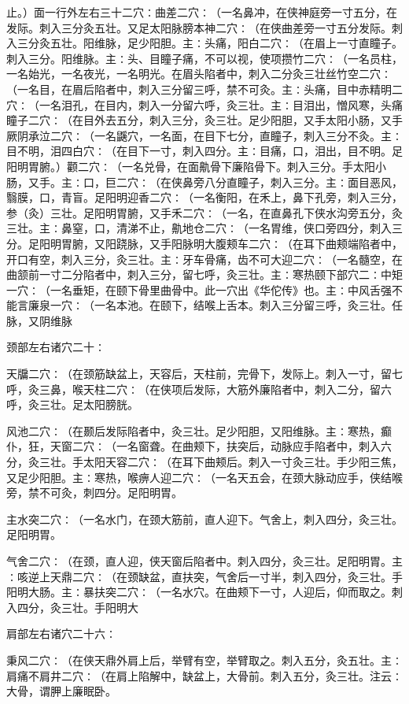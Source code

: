 \documentclass[a4paper,12pt,UTF8,twoside]{ctexbook}
\begin{document}
止。）面一行外左右三十二穴∶曲差二穴∶（一名鼻冲，在侠神庭旁一寸五分，在发际。刺入三分灸五壮。又足太阳脉膀本神二穴∶（在侠曲差旁一寸五分发际。刺入三分灸五壮。阳维脉，足少阳胆。主∶头痛，阳白二穴∶（在眉上一寸直瞳子。刺入三分。阳维脉。主∶头、目瞳子痛，不可以视，使项攒竹二穴∶（一名员柱，一名始光，一名夜光，一名明光。在眉头陷者中，刺入二分灸三壮丝竹空二穴∶（一名目，在眉后陷者中，刺入三分留三呼，禁不可灸。主∶头痛，目中赤精明二穴∶（一名泪孔，在目内，刺入一分留六呼，灸三壮。主∶目泪出，憎风寒，头痛瞳子二穴∶（在目外去五分，刺入三分，灸三壮。足少阳胆，又手太阳小肠，又手厥阴承泣二穴∶（一名鼷穴，一名面，在目下七分，直瞳子，刺入三分不灸。主∶目不明，泪四白穴∶（在目下一寸，刺入四分。主∶目痛，口，泪出，目不明。足阳明胃腑。）颧二穴∶（一名兑骨，在面鼽骨下廉陷骨下。刺入三分。手太阳小肠，又手。主∶口，巨二穴∶（在侠鼻旁八分直瞳子，刺入三分。主∶面目恶风，翳膜，口，青盲。足阳明迎香二穴∶（一名衡阳，在禾上，鼻下孔旁，刺入三分，参（灸）三壮。足阳明胃腑，又手禾二穴∶（一名，在直鼻孔下侠水沟旁五分，灸三壮。主∶鼻窒，口，清涕不止，鼽地仓二穴∶（一名胃维，侠口旁四分，刺入三分。足阳明胃腑，又阳跷脉，又手阳脉明大腹颊车二穴∶（在耳下曲颊端陷者中，开口有空，刺入三分，灸三壮。主∶牙车骨痛，齿不可大迎二穴∶（一名髓空，在曲颔前一寸二分陷者中，刺入三分，留七呼，灸三壮。主∶寒热颐下部穴二∶中矩一穴∶（一名垂矩，在颐下骨里曲骨中。此一穴出《华佗传》也。主∶中风舌强不能言廉泉一穴∶（一名本池。在颐下，结喉上舌本。刺入三分留三呼，灸三壮。任脉，又阴维脉

颈部左右诸穴二十∶

天牖二穴∶（在颈筋缺盆上，天容后，天柱前，完骨下，发际上。刺入一寸，留七呼，灸三鼻，喉天柱二穴∶（在侠项后发际，大筋外廉陷者中，刺入二分，留六呼，灸三壮。足太阳膀胱。

风池二穴∶（在颞后发际陷者中，灸三壮。足少阳胆，又阳维脉。主∶寒热，癫仆，狂，天窗二穴∶（一名窗聋。在曲颊下，扶突后，动脉应手陷者中，刺入六分，灸三壮。手太阳天容二穴∶（在耳下曲颊后。刺入一寸灸三壮。手少阳三焦，又足少阳胆。主∶寒热，喉痹人迎二穴∶（一名天五会，在颈大脉动应手，侠结喉旁，禁不可灸，刺四分。足阳明胃。

主水突二穴∶（一名水门，在颈大筋前，直人迎下。气舍上，刺入四分，灸三壮。足阳明胃。

气舍二穴∶（在颈，直人迎，侠天窗后陷者中。刺入四分，灸三壮。足阳明胃。主∶咳逆上天鼎二穴∶（在颈缺盆，直扶突，气舍后一寸半，刺入四分，灸三壮。手阳明大肠。主∶暴扶突二穴∶（一名水穴。在曲颊下一寸，人迎后，仰而取之。刺入四分，灸三壮。手阳明大

肩部左右诸穴二十六∶

秉风二穴∶（在侠天鼎外肩上后，举臂有空，举臂取之。刺入五分，灸五壮。主∶肩痛不肩井二穴∶（在肩上陷解中，缺盆上，大骨前。刺入五分，灸三壮。注云∶大骨，谓胛上廉眠卧。
\end{document}
